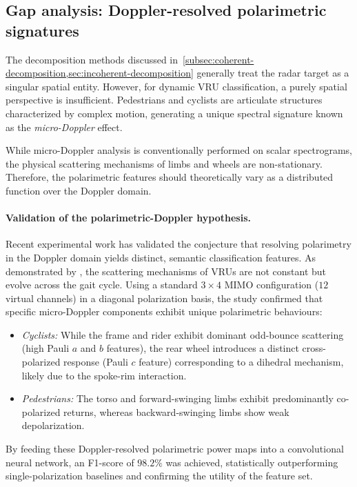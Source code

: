 \subsection{Gap analysis: Doppler-resolved polarimetric signatures}
\label{subsec:gap-analysis}

The decomposition methods discussed in~\cref{subsec:coherent-decomposition,sec:incoherent-decomposition} generally treat the radar target as a singular spatial entity.
However, for dynamic VRU classification, a purely spatial perspective is insufficient.
Pedestrians and cyclists are articulate structures characterized by complex motion, generating a unique spectral signature known as the \emph{micro-Doppler} effect.

While micro-Doppler analysis is conventionally performed on scalar spectrograms, the physical scattering mechanisms of limbs and wheels are non-stationary.
Therefore, the polarimetric features should theoretically vary as a distributed function over the Doppler domain.

\paragraph{Validation of the polarimetric-Doppler hypothesis.} Recent experimental work has validated the conjecture that resolving polarimetry in the Doppler domain yields distinct, semantic classification features.
As demonstrated by \textcite{bouwmeesterClassificationDynamicVulnerable2025}, the scattering mechanisms of VRUs are not constant but evolve across the gait cycle.
Using a standard $3 \times 4$ MIMO configuration ($12$ virtual channels) in a diagonal polarization basis, the study confirmed that specific micro-Doppler components exhibit unique polarimetric behaviours:
\begin{itemize}
    \item \emph{Cyclists:} While the frame and rider exhibit dominant odd-bounce scattering (high Pauli $a$ and $b$ features), the rear wheel introduces a distinct cross-polarized response (Pauli $c$ feature) corresponding to a dihedral mechanism, likely due to the spoke-rim interaction.
    \item \emph{Pedestrians:} The torso and forward-swinging limbs exhibit predominantly co-polarized returns, whereas backward-swinging limbs show weak depolarization.
\end{itemize}
By feeding these Doppler-resolved polarimetric power maps into a convolutional neural network, an F1-score of $98.2\%$ was achieved, statistically outperforming single-polarization baselines and confirming the utility of the feature set.

